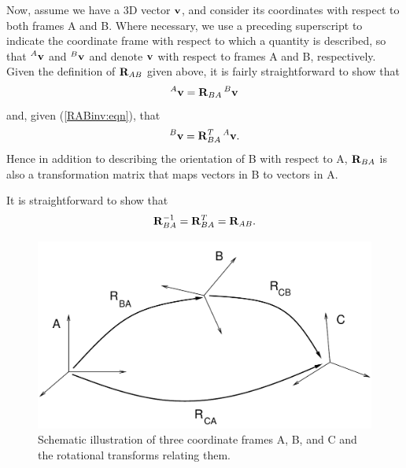 Now, assume we have a 3D vector ${\bf v}$, and consider its coordinates
with respect to both frames A and B.  Where necessary, we use a
preceding superscript to indicate the coordinate frame with respect to
which a quantity is described, so that ${}^A{\bf v}$ and ${}^B{\bf v}$ and
denote ${\bf v}$ with respect to frames A and B, respectively.  Given the
definition of ${\bf R}_{AB}$ given above, it is fairly straightforward to
show that
%
\begin{equation}
{}^A{\bf v} = {\bf R}_{BA} \, {}^B{\bf v}
\label{vectorTransform:eqn}
\end{equation}
%
and, given (\ref{RABinv:eqn}), that
%
\begin{equation}
{}^B{\bf v} = {\bf R}_{BA}^T \, {}^A{\bf v}.
\label{vectorInvTransform:eqn}
\end{equation}
%
Hence in addition to describing the orientation of B with respect to A,
${\bf R}_{BA}$ is also a transformation matrix that maps vectors in B
to vectors in A.

It is straightforward to show that
%
\begin{equation}
{\bf R}_{BA}^{-1} = {\bf R}_{BA}^T = {\bf R}_{AB}.
\label{rotationInverse:eqn}
\end{equation}
%

\begin{figure}[t]
\begin{center}
 \includegraphics[width=4.5in]{images/rotationsABC}
\end{center}
\caption{Schematic illustration of three coordinate frames A, B, and C
and the rotational transforms relating them.}
\label{rotationsABC:fig}
\end{figure}

